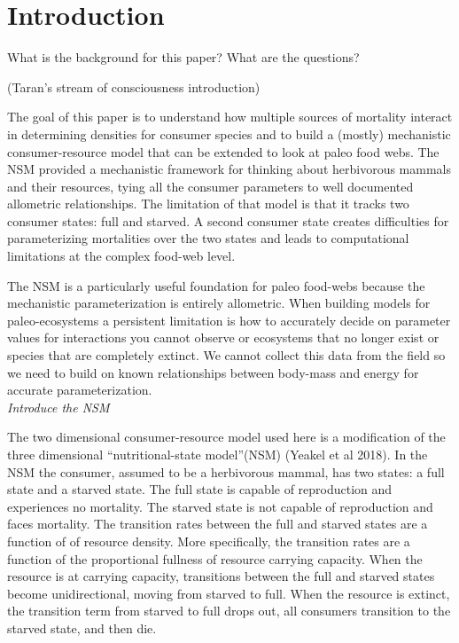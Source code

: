 \documentclass[]{rsos}%
\begin{document}
\section{Introduction}
What is the background for this paper? 
What are the questions?

(Taran’s stream of consciousness introduction)

The goal of this paper is to understand how multiple sources of mortality interact in determining densities for consumer species and to build a (mostly) mechanistic consumer-resource model that can be extended to look at paleo food webs. The NSM provided a mechanistic framework for thinking about herbivorous mammals and their resources, tying all the consumer parameters to well documented allometric relationships. The limitation of that model is that it tracks two consumer states: full and starved. A second consumer state creates difficulties for parameterizing mortalities over the two states and leads to computational limitations at the complex food-web level. 

The NSM is a particularly useful foundation for paleo food-webs because the mechanistic parameterization is entirely allometric. When building models for paleo-ecosystems a persistent limitation is how to accurately decide on parameter values for interactions you cannot observe or ecosystems that no longer exist or species that are completely extinct. We cannot collect this data from the field so we need to build on known relationships between body-mass and energy for accurate parameterization. \\




\emph{Introduce the NSM}

The two dimensional consumer-resource model used here is a modification of the three dimensional “nutritional-state model”(NSM) (Yeakel et al 2018). In the NSM the consumer, assumed to be a herbivorous mammal, has two states: a full state and a starved state. The full state is capable of reproduction and experiences no mortality. The starved state is not capable of reproduction and faces mortality. The transition rates between the full and starved states are a function of of resource density. More specifically, the transition rates are a function of the proportional fullness of resource carrying capacity. When the resource is at carrying capacity, transitions between the full and starved states become unidirectional, moving from starved to full. When the resource is extinct, the transition term from starved to full drops out, all consumers transition to the starved state, and then die. \\
\end{document}
